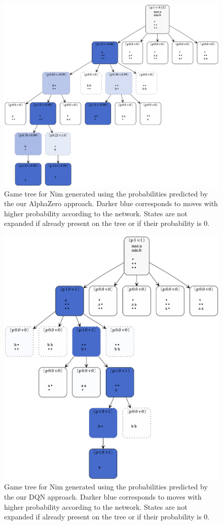 \documentclass[12pt,a4paper]{article}
\begin{document}
\begin{figure}
  \includegraphics[width=0.9\linewidth]{img/nim-alpha-zero.png}
  \centering 
  \caption{Game tree for Nim generated using the probabilities predicted by the our AlphaZero approach. Darker blue corresponds to moves with higher probability according to the network. States are not expanded if already present on the tree or if their probability is 0.}
  \label{fig:nim-alphazero}
\end{figure}

\begin{figure}
  \includegraphics[width=0.7\linewidth]{img/nim-rl.png}
  \centering 
  \caption{Game tree for Nim generated using the probabilities predicted by the our DQN approach. Darker blue corresponds to moves with higher probability according to the network. States are not expanded if already present on the tree or if their probability is 0.}
  \label{fig:nim-rl}
\end{figure}
\end{document}
